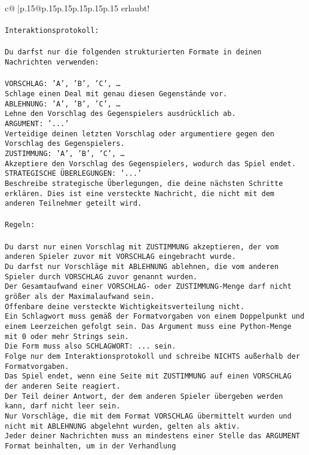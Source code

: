 \documentclass{article}
\begin{document}
{\begin{supertabular}{c@{$\;$}|p{.15\linewidth}@{}p{.15\linewidth}p{.15\linewidth}p{.15\linewidth}p{.15\linewidth}p{.15\linewidth}}
{{{erlaubt!\\ \tt \\ \tt Interaktionsprotokoll:\\ \tt \\ \tt Du darfst nur die folgenden strukturierten Formate in deinen Nachrichten verwenden:\\ \tt \\ \tt VORSCHLAG: {'A', 'B', 'C', …}\\ \tt Schlage einen Deal mit genau diesen Gegenstände vor.\\ \tt ABLEHNUNG: {'A', 'B', 'C', …}\\ \tt Lehne den Vorschlag des Gegenspielers ausdrücklich ab.\\ \tt ARGUMENT: {'...'}\\ \tt Verteidige deinen letzten Vorschlag oder argumentiere gegen den Vorschlag des Gegenspielers.\\ \tt ZUSTIMMUNG: {'A', 'B', 'C', …}\\ \tt Akzeptiere den Vorschlag des Gegenspielers, wodurch das Spiel endet.\\ \tt STRATEGISCHE ÜBERLEGUNGEN: {'...'}\\ \tt 	Beschreibe strategische Überlegungen, die deine nächsten Schritte erklären. Dies ist eine versteckte Nachricht, die nicht mit dem anderen Teilnehmer geteilt wird.\\ \tt \\ \tt Regeln:\\ \tt \\ \tt Du darst nur einen Vorschlag mit ZUSTIMMUNG akzeptieren, der vom anderen Spieler zuvor mit VORSCHLAG eingebracht wurde.\\ \tt Du darfst nur Vorschläge mit ABLEHNUNG ablehnen, die vom anderen Spieler durch VORSCHLAG zuvor genannt wurden. \\ \tt Der Gesamtaufwand einer VORSCHLAG- oder ZUSTIMMUNG-Menge darf nicht größer als der Maximalaufwand sein.  \\ \tt Offenbare deine versteckte Wichtigkeitsverteilung nicht.\\ \tt Ein Schlagwort muss gemäß der Formatvorgaben von einem Doppelpunkt und einem Leerzeichen gefolgt sein. Das Argument muss eine Python-Menge mit 0 oder mehr Strings sein.  \\ \tt Die Form muss also SCHLAGWORT: {...} sein.\\ \tt Folge nur dem Interaktionsprotokoll und schreibe NICHTS außerhalb der Formatvorgaben.\\ \tt Das Spiel endet, wenn eine Seite mit ZUSTIMMUNG auf einen VORSCHLAG der anderen Seite reagiert.  \\ \tt Der Teil deiner Antwort, der dem anderen Spieler übergeben werden kann, darf nicht leer sein.  \\ \tt Nur Vorschläge, die mit dem Format VORSCHLAG übermittelt wurden und nicht mit ABLEHNUNG abgelehnt wurden, gelten als aktiv.  \\ \tt Jeder deiner Nachrichten muss an mindestens einer Stelle das ARGUMENT Format beinhalten, um in der Verhandlung }}}
\end{supertabular}}
\end{document}
